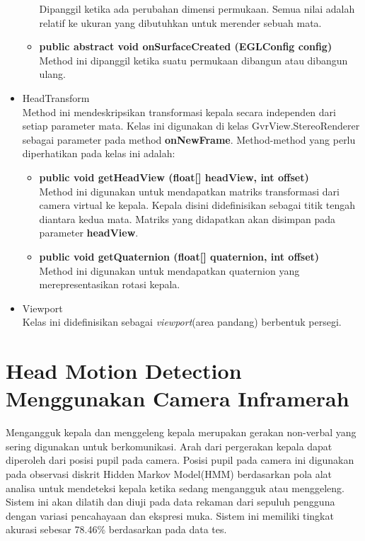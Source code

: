 \begin{itemize}
\begin{itemize}
	Dipanggil ketika ada perubahan dimensi permukaan. Semua nilai adalah relatif ke ukuran yang dibutuhkan untuk merender sebuah mata.
	\item \textbf{public abstract void onSurfaceCreated (EGLConfig config)}\\
	Method ini dipanggil ketika suatu permukaan dibangun atau dibangun ulang.
\end{itemize}
\item HeadTransform\\
	Method ini mendeskripsikan transformasi kepala secara independen dari setiap parameter mata. Kelas ini digunakan di kelas GvrView.StereoRenderer sebagai parameter pada method \textbf{onNewFrame}. Method-method yang perlu diperhatikan pada kelas ini adalah:
	\begin{itemize}
		\item \textbf{public void getHeadView (float[] headView, int offset)}\\
		Method ini digunakan untuk mendapatkan matriks transformasi dari camera virtual ke kepala. Kepala disini didefinisikan sebagai titik tengah diantara kedua mata. Matriks yang didapatkan akan disimpan pada parameter \textbf{headView}.
		\item \textbf{public void getQuaternion (float[] quaternion, int offset)}\\
		Method ini digunakan untuk mendapatkan quaternion yang merepresentasikan rotasi kepala.
	\end{itemize}
	\item Viewport\\
	Kelas ini didefinisikan sebagai \textit{viewport}(area pandang) berbentuk persegi.
\end{itemize}
\section{Head Motion Detection Menggunakan Camera Inframerah}
\label{sec:head_motion_detection}
\cite{kapoor2001real}Mengangguk kepala dan menggeleng kepala merupakan gerakan non-verbal yang sering digunakan untuk berkomunikasi.  Arah dari pergerakan kepala dapat diperoleh dari posisi pupil pada camera. Posisi pupil pada camera ini digunakan pada observasi diskrit Hidden Markov Model(HMM) berdasarkan pola alat analisa untuk mendeteksi kepala ketika sedang mengangguk atau menggeleng. Sistem ini akan dilatih dan diuji pada data rekaman dari sepuluh pengguna dengan variasi pencahayaan dan ekspresi muka. Sistem ini memiliki tingkat akurasi sebesar 78.46\% berdasarkan pada data tes.

